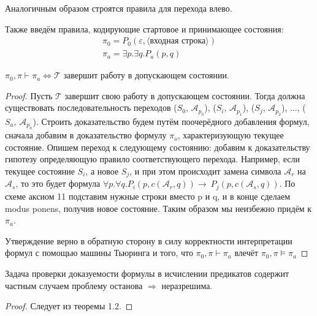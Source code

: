 Аналогичным образом строятся правила для перехода влево. 

Также введём правила, кодирующие стартовое и принимающее состояния:
\begin{gather}
    \pi_0=P_0(\varepsilon, \langle\text{входная строка}\rangle) \\
    \pi_a=\exists p.\exists q.P_a(p, q)
\end{gather}

\begin{theorem} 
    $\pi_0, \pi \vdash \pi_a \Longleftrightarrow \mathcal{T}$ завершит работу в допускающем состоянии.
\end{theorem} 
\begin{proof}
    Пусть $\mathcal{T}$ завершит свою работу в допускающем состоянии. Тогда должна существовать
    последовательность переходов ($S_0$, $\mathcal{A}_{p_0}$), ($S_i$, $\mathcal{A}_{p_1}$), ($S_j$,
    $\mathcal{A}_{p_2}$), $\ldots$, ($S_a$, $\mathcal{A}_{p_n}$). Строить доказательство будем путём
    поочерёдного добавления формул, сначала добавим в доказательство формулу $\pi_o$, характеризующую
    текущее состояние. Опишем переход к следующему состоянию: добавим к доказательству гипотезу
    определяющую правило соответствующего перехода. Например, если текущее состояние $S_i$, а новое
    $S_j$, и при этом происходит замена символа $\mathcal{A}_r$ на $\mathcal{A}_s$, то это будет формула
    $\forall p.\forall q.P_i(p, c(\mathcal{A}_r, q)) \rightarrow\ P_j(p, c(\mathcal{A}_s, q))$. По схеме
    аксиом 11 подставим нужные строки вместо p и q, и в конце сделаем modus ponens, получив новое
    состояние. Таким образом мы неизбежно придём к $\pi_a$.
    
    Утверждение верно в обратную сторону в силу корректности интерпретации формул с помощью машины
    Тьюринга и того, что $\pi_0, \pi \vdash \pi_a$ влечёт $\pi_0, \pi \vDash \pi_a$
\end{proof}

\begin{theorem}
    Задача проверки доказуемости формулы в исчислении предикатов содержит частным случаем проблему
    останова $\Rightarrow$ неразрешима.
\end{theorem}
\begin{proof}
    Следует из теоремы 1.2.
\end{proof}
